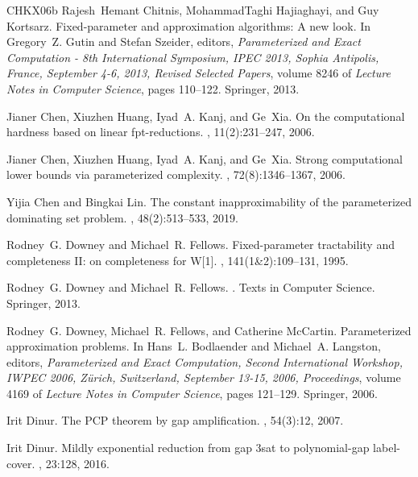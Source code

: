 \documentclass[10pt,a4paper]{article}
\begin{document}
\begin{thebibliography}{CHKX06b}
Rajesh~Hemant Chitnis, MohammadTaghi Hajiaghayi, and Guy Kortsarz.
\newblock Fixed-parameter and approximation algorithms: {A} new look.
\newblock In Gregory~Z. Gutin and Stefan Szeider, editors, {\em Parameterized
  and Exact Computation - 8th International Symposium, {IPEC} 2013, Sophia
  Antipolis, France, September 4-6, 2013, Revised Selected Papers}, volume 8246
  of {\em Lecture Notes in Computer Science}, pages 110--122. Springer, 2013.

Jianer Chen, Xiuzhen Huang, Iyad~A. Kanj, and Ge~Xia.
\newblock On the computational hardness based on linear fpt-reductions.
, 11(2):231--247, 2006.

Jianer Chen, Xiuzhen Huang, Iyad~A. Kanj, and Ge~Xia.
\newblock Strong computational lower bounds via parameterized complexity.
, 72(8):1346--1367, 2006.

Yijia Chen and Bingkai Lin.
\newblock The constant inapproximability of the parameterized dominating set
  problem.
, 48(2):513--533, 2019.

Rodney~G. Downey and Michael~R. Fellows.
\newblock Fixed-parameter tractability and completeness {II:} on completeness
  for {W[1]}.
, 141(1{\&}2):109--131, 1995.

Rodney~G. Downey and Michael~R. Fellows.
.
\newblock Texts in Computer Science. Springer, 2013.

Rodney~G. Downey, Michael~R. Fellows, and Catherine McCartin.
\newblock Parameterized approximation problems.
\newblock In Hans~L. Bodlaender and Michael~A. Langston, editors, {\em
  Parameterized and Exact Computation, Second International Workshop, {IWPEC}
  2006, Z{\"{u}}rich, Switzerland, September 13-15, 2006, Proceedings}, volume
  4169 of {\em Lecture Notes in Computer Science}, pages 121--129. Springer,
  2006.

Irit Dinur.
\newblock The {PCP} theorem by gap amplification.
, 54(3):12, 2007.

Irit Dinur.
\newblock Mildly exponential reduction from gap 3sat to polynomial-gap
  label-cover.
,
  23:128, 2016.


\end{thebibliography}
\end{document}
